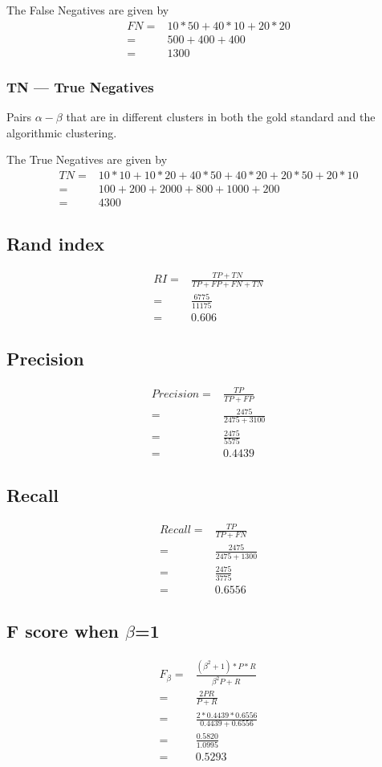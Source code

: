 \documentclass{article}
\begin{document}
The False Negatives are given by 
\begin{align*}
  FN =& 10*50 + 40*10 + 20*20 \\
  =& 500 + 400 + 400 \\
  =& 1300
\end{align*}

\subsubsection{TN --- True Negatives}
Pairs $ \alpha -  \beta $ that are in different clusters in both the gold standard and the algorithmic clustering.

The True Negatives are given by 
\begin{align*}
  TN =& 10*10 + 10*20 + 40*50 + 40*20 + 20*50 + 20*10 \\
  =& 100 + 200 + 2000 + 800 + 1000 + 200 \\
  =& 4300
\end{align*}

\subsection{Rand index}
\begin{align*}
  RI = & \frac{TP + TN}{TP + FP + FN + TN} \\
  =& \frac{6775}{11175} \\
  =& 0.606
\end{align*}

\subsection{Precision}
\begin{align*}
  Precision =& \frac{TP}{TP+FP} \\
  =& \frac{2475}{2475 + 3100}\\
  =& \frac{2475}{5575} \\
  =& 0.4439
\end{align*}

\subsection{Recall}
\begin{align*}
  Recall =& \frac{TP}{TP + FN} \\
  =& \frac{2475}{2475 + 1300} \\
  =& \frac{2475}{3775} \\
  =& 0.6556
\end{align*}

\subsection{F score when $\beta$=1}
\begin{align*}
  F_{\beta} =& \frac{(\beta^{2} + 1) * P * R}{\beta^{2}P + R} \\
  =& \frac{2PR}{P+R} \\
  =& \frac{2 * 0.4439 * 0.6556}{0.4439 + 0.6556} \\
  =& \frac{0.5820}{1.0995} \\
  =& 0.5293
\end{align*}
\end{document}
